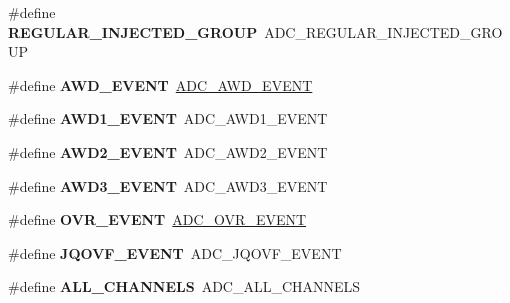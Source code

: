 \begin{DoxyCompactItemize}
\#define {\bfseries R\+E\+G\+U\+L\+A\+R\+\_\+\+I\+N\+J\+E\+C\+T\+E\+D\+\_\+\+G\+R\+O\+UP}~A\+D\+C\+\_\+\+R\+E\+G\+U\+L\+A\+R\+\_\+\+I\+N\+J\+E\+C\+T\+E\+D\+\_\+\+G\+R\+O\+UP
\item 
\mbox{\label{group___h_a_l___a_d_c___aliased___defines_ga21fdc6d3f5ae5c030acc0f5518fbea4a}} 
\#define {\bfseries A\+W\+D\+\_\+\+E\+V\+E\+NT}~\hyperlink{group___a_d_c___event__type_ga2d1d545ea1bfecba7a7081be6ef2cb93}{A\+D\+C\+\_\+\+A\+W\+D\+\_\+\+E\+V\+E\+NT}
\item 
\mbox{\label{group___h_a_l___a_d_c___aliased___defines_ga1429af679941d537c64f7004430fdf54}} 
\#define {\bfseries A\+W\+D1\+\_\+\+E\+V\+E\+NT}~A\+D\+C\+\_\+\+A\+W\+D1\+\_\+\+E\+V\+E\+NT
\item 
\mbox{\label{group___h_a_l___a_d_c___aliased___defines_ga04d97e3fb4776a8fae622cf88b442687}} 
\#define {\bfseries A\+W\+D2\+\_\+\+E\+V\+E\+NT}~A\+D\+C\+\_\+\+A\+W\+D2\+\_\+\+E\+V\+E\+NT
\item 
\mbox{\label{group___h_a_l___a_d_c___aliased___defines_gabb3f690eef894c37c3f2c49e1d8c6c06}} 
\#define {\bfseries A\+W\+D3\+\_\+\+E\+V\+E\+NT}~A\+D\+C\+\_\+\+A\+W\+D3\+\_\+\+E\+V\+E\+NT
\item 
\mbox{\label{group___h_a_l___a_d_c___aliased___defines_gaf63a166dce844ba44197109fe3a3d02f}} 
\#define {\bfseries O\+V\+R\+\_\+\+E\+V\+E\+NT}~\hyperlink{group___a_d_c___event__type_gae1ef5aaecb2d24cac50a59f1bc311221}{A\+D\+C\+\_\+\+O\+V\+R\+\_\+\+E\+V\+E\+NT}
\item 
\mbox{\label{group___h_a_l___a_d_c___aliased___defines_gae63ff704e73ca97890da8a07e141bb96}} 
\#define {\bfseries J\+Q\+O\+V\+F\+\_\+\+E\+V\+E\+NT}~A\+D\+C\+\_\+\+J\+Q\+O\+V\+F\+\_\+\+E\+V\+E\+NT
\item 
\mbox{\label{group___h_a_l___a_d_c___aliased___defines_gac9dcdba2096f6b3adab742b8b1a256c2}} 
\#define {\bfseries A\+L\+L\+\_\+\+C\+H\+A\+N\+N\+E\+LS}~A\+D\+C\+\_\+\+A\+L\+L\+\_\+\+C\+H\+A\+N\+N\+E\+LS

\end{DoxyCompactItemize}
